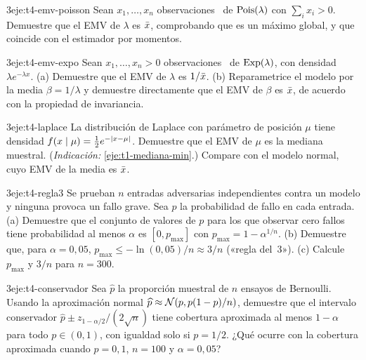 \begin{ejercicio}{3}{eje:t4-emv-poisson}
Sean $x_1,\dots,x_n$ observaciones \iid\ de $\operatorname{Pois}(\lambda)$ con $\sum_ix_i>0$. Demuestre que el EMV de $\lambda$ es $\bar{x}$, comprobando que es un máximo global, y que coincide con el estimador por momentos.
\end{ejercicio}

\begin{ejercicio}{3}{eje:t4-emv-expo}
Sean $x_1,\dots,x_n>0$ observaciones \iid\ de $\operatorname{Exp}(\lambda)$, con densidad $\lambda e^{-\lambda x}$. (a) Demuestre que el EMV de $\lambda$ es $1/\bar{x}$. (b) Reparametrice el modelo por la media $\beta=1/\lambda$ y demuestre directamente que el EMV de $\beta$ es $\bar{x}$, de acuerdo con la propiedad de invariancia.
\end{ejercicio}

\begin{ejercicio}{3}{eje:t4-laplace}
La distribución de Laplace con parámetro de posición $\mu$ tiene densidad $f(x\mid\mu)=\frac12e^{-\lvert x-\mu\rvert}$. Demuestre que el EMV de $\mu$ es la mediana muestral. (\emph{Indicación:} \cref{eje:t1-mediana-min}.) Compare con el modelo normal, cuyo EMV de la media es $\bar{x}$.
\end{ejercicio}

\begin{ejercicio}{3}{eje:t4-regla3}
Se prueban $n$ entradas adversarias independientes contra un modelo y ninguna provoca un fallo grave. Sea $p$ la probabilidad de fallo en cada entrada. (a) Demuestre que el conjunto de valores de $p$ para los que observar cero fallos tiene probabilidad al menos $\alpha$ es $[0,p_{\max}]$ con $p_{\max}=1-\alpha^{1/n}$. (b) Demuestre que, para $\alpha=0{,}05$, $p_{\max}\le-\ln(0{,}05)/n\approx3/n$ («regla del~3»). (c) Calcule $p_{\max}$ y $3/n$ para $n=300$.
\end{ejercicio}

\begin{ejercicio}{3}{eje:t4-conservador}
Sea $\widehat p$ la proporción muestral de $n$ ensayos de Bernoulli. Usando la aproximación normal $\widehat p\approx\mathcal{N}(p,p(1-p)/n)$, demuestre que el intervalo conservador $\widehat p\pm z_{1-\alpha/2}/(2\sqrt n)$ tiene cobertura aproximada al menos $1-\alpha$ para todo $p\in(0,1)$, con igualdad solo si $p=1/2$. ¿Qué ocurre con la cobertura aproximada cuando $p=0{,}1$, $n=100$ y $\alpha=0{,}05$?
\end{ejercicio}
